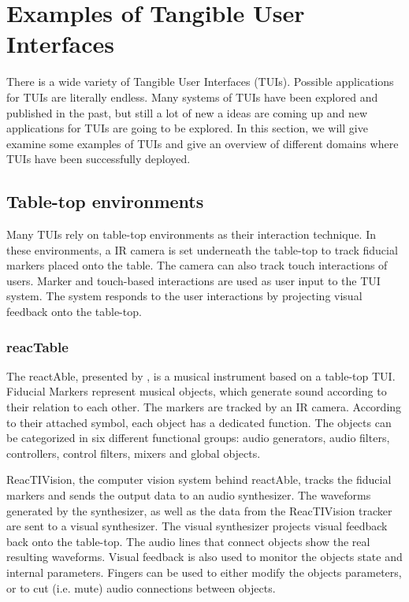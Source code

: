 \section{Examples of Tangible User Interfaces}
There is a wide variety of Tangible User Interfaces (TUIs). Possible applications for TUIs are literally endless. Many systems of TUIs have been explored and published in the past, but still a lot of new a ideas are coming up and new applications for TUIs are going to be explored. In this section, we will give examine some examples of TUIs and give an overview of different domains where TUIs have been successfully deployed.

\subsection{Table-top environments}
Many TUIs rely on table-top environments as their interaction technique. In these environments, a IR camera is set underneath the table-top to track fiducial markers placed onto the table. The camera can also track touch interactions of users. Marker and touch-based interactions are used as user input to the TUI system. The system responds to the user interactions by projecting visual feedback onto the table-top.

\subsubsection{reacTable}
The reactAble, presented by \cite{jorda07}, is a musical instrument based on a table-top TUI. Fiducial Markers represent musical objects, which generate sound according to their relation to each other. The markers are tracked by an IR camera. According to their attached symbol, each object has a dedicated function. The objects can be categorized in six different functional groups: audio generators, audio filters, controllers, control filters, mixers and global objects. 

ReacTIVision, the computer vision system behind reactAble, tracks the fiducial markers and sends the output data to an audio synthesizer. The waveforms generated by the synthesizer, as well as the data from the ReacTIVision tracker are sent to a visual synthesizer. The visual synthesizer projects visual feedback back onto the table-top. The audio lines that connect objects show the real resulting waveforms. Visual feedback is also used to monitor the objects state and internal parameters. Fingers can be used to either modify the objects parameters, or to cut (i.e. mute) audio connections between objects. 

